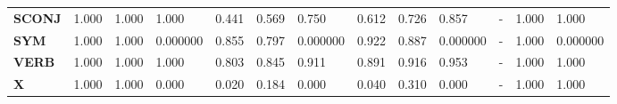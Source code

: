 \begin{table}
\begin{tabular}{|l||l||l||l||l||l||l||l||l||l||l||l||l|}
\textbf{SCONJ} & 1.000 & 1.000 & 1.000 & 0.441 & 0.569 & 0.750 & 0.612 & 0.726 & 0.857 & - & 1.000 & 1.000 \\
\textbf{SYM} & 1.000 & 1.000 & 0.000000 & 0.855 & 0.797 & 0.000000 & 0.922 & 0.887 & 0.000000 & - & 1.000 & 0.000000 \\
\textbf{VERB} & 1.000 & 1.000 & 1.000 & 0.803 & 0.845 & 0.911 & 0.891 & 0.916 & 0.953 & - & 1.000 & 1.000 \\
\textbf{X} & 1.000 & 1.000 & 0.000 & 0.020 & 0.184 & 0.000 & 0.040 & 0.310 & 0.000 & - & 1.000 & 1.000 \\
\bottomrule
\end{tabular}
\end{table}
